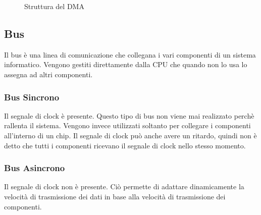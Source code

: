 \documentclass[a4paper]{article}
\theoremstyle{break}
\theoremstyle{break}
\theoremstyle{break}
\theoremstyle{break}
\begin{document}
\begin{figure}[H]
	\centering
	\caption{Struttura del DMA}
\end{figure}


\subsection{Bus}
Il bus è una linea di comunicazione che collegana i vari componenti di un sistema
informatico. Vengono gestiti direttamente dalla CPU che quando non lo usa lo assegna ad
altri componenti.

\subsubsection{Bus Sincrono}
Il segnale di clock è presente. Questo tipo di bus
non viene mai realizzato perchè rallenta il sistema. Vengono invece utilizzati
soltanto per collegare i componenti all'interno di un chip. Il segnale di clock
può anche avere un ritardo, quindi non è detto che tutti i componenti ricevano
il segnale di clock nello stesso momento.

\subsubsection{Bus Asincrono}
Il segnale di clock non è presente. Ciò permette di
adattare dinamicamente la velocità di trasmissione dei dati in base alla
velocità di trasmissione dei componenti.
\end{document}
